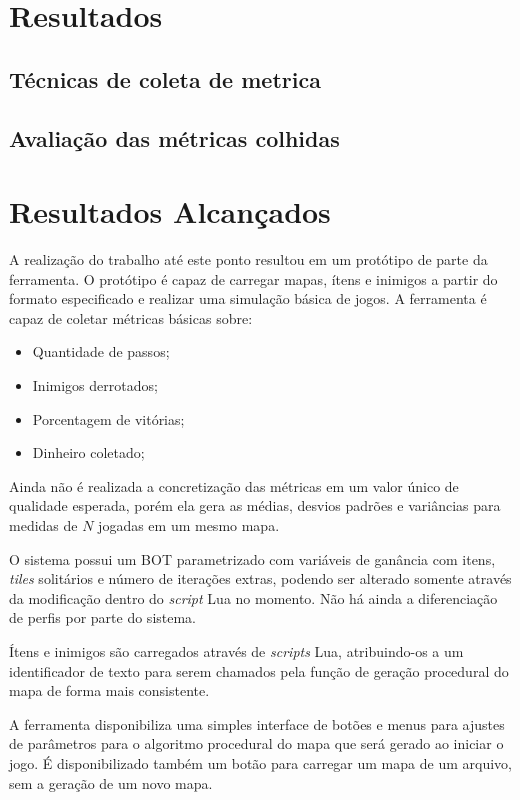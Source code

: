 \chapter[Resultados]{Resultados}

\section{Técnicas de coleta de metrica}



\section{Avaliação das métricas colhidas}



\chapter{Resultados Alcançados}

	A realização do trabalho até este ponto resultou em um protótipo de parte da ferramenta. O protótipo é capaz de carregar mapas, ítens e inimigos a partir do formato especificado e realizar uma simulação básica de jogos. 
	A ferramenta é capaz de coletar métricas básicas sobre:
\begin{itemize}			
	\item Quantidade de passos;
	\item Inimigos derrotados;
	\item Porcentagem de vitórias;
	\item Dinheiro coletado;
\end{itemize}

	Ainda não é realizada a concretização das métricas em um valor único de qualidade esperada, porém ela gera as médias, desvios padrões e variâncias para medidas de $N$ jogadas em um mesmo mapa. 
	
	O sistema possui um BOT parametrizado com variáveis de ganância com itens, \textit{tiles} solitários e número de iterações extras, podendo ser alterado somente através da modificação dentro do \textit{script} Lua no momento. Não há ainda a diferenciação de perfis por parte do sistema. 
	
	Ítens e inimigos são carregados através de \textit{scripts} Lua, atribuindo-os a um identificador de texto para serem chamados pela função de geração procedural do mapa de forma mais consistente. 
	
	A ferramenta disponibiliza uma simples interface de botões e menus para ajustes de parâmetros para o algoritmo procedural do mapa que será gerado ao iniciar o jogo. É disponibilizado também um botão para carregar um mapa de um arquivo, sem a geração de um novo mapa. 
	
